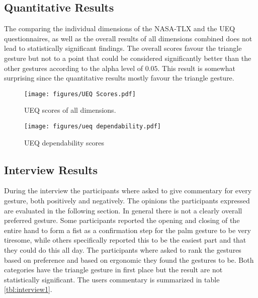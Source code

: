 
\subsection{Quantitative Results}
The comparing the individual dimensions of the NASA-TLX and the UEQ questionnaires, as well as the overall results of all dimensions combined does not lead to statistically significant findings. The overall scores favour the triangle gesture but not to a point that could be considered significantly better than the other gestures according to the alpha level of $0.05$. This result is somewhat surprising since the quantitative results mostly favour the triangle gesture. 


\begin{figure}[!ht]
    \centering
    \texttt{[image: figures/UEQ Scores.pdf]}
    \caption{UEQ scores of all dimensions.}
    \label{fig:ueqDimensions}
\end{figure}

\begin{figure}[!ht]
    \centering
    \texttt{[image: figures/ueq dependability.pdf]}
    \caption{UEQ dependability scores}
    \label{fig:ueqDependability}
\end{figure}


\subsection{Interview Results}
During the interview the participants where asked to give commentary for every gesture, both positively and negatively. The opinions the participants expressed are evaluated in the following section. In general there is not a clearly overall preferred gesture. Some participants reported the opening and closing of the entire hand to form a fist as a confirmation step for the palm gesture to be very tiresome, while others specifically reported this to be the easiest part and that they could do this all day. The participants where asked to rank the gestures based on preference and based on ergonomic they found the gestures to be. Both categories have the triangle gesture in first place but the result are not statistically significant. The users commentary is summarized in table \ref{tbl:interview1}. 

